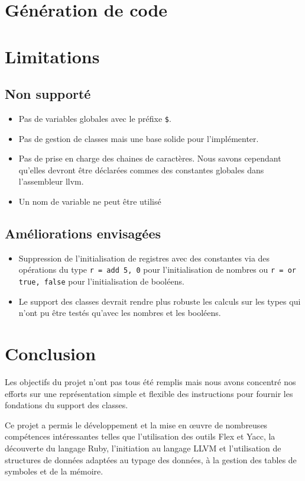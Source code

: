 \documentclass[12pt]{article}
\begin{document}
\section{Génération de code}

\section{Limitations}

\subsection{Non supporté}
\begin{itemize}
	\item Pas de variables globales avec le préfixe \verb!$!.
	\item Pas de gestion de classes mais une base solide pour l'implémenter.
	\item Pas de prise en charge des chaines de caractères. Nous savons cependant qu'elles devront être déclarées commes des constantes globales dans l'assembleur llvm.
	\item Un nom de variable ne peut être utilisé 
\end{itemize}

\subsection{Améliorations envisagées}
\begin{itemize}
	\item Suppression de l'initialisation de registres avec des constantes via des opérations du type \verb!r = add 5, 0! pour l'initialisation de nombres ou \verb!r = or true, false! pour l'initialisation de booléens.
	\item Le support des classes devrait rendre plus robuste les calculs sur les types qui n'ont pu être testés qu'avec les nombres et les booléens.
\end{itemize}

\section{Conclusion}

Les objectifs du projet n'ont pas tous été remplis mais nous avons concentré nos efforts sur une représentation simple et flexible des instructions pour fournir les fondations du support des classes.

Ce projet a permis le développement et la mise en œuvre de nombreuses
compétences intéressantes telles que l'utilisation des outils Flex et Yacc, la
découverte du langage Ruby, l'initiation au langage LLVM et l'utilisation de
structures de données adaptées au typage des données, à la gestion des tables
de symboles et de la mémoire.
\end{document}
